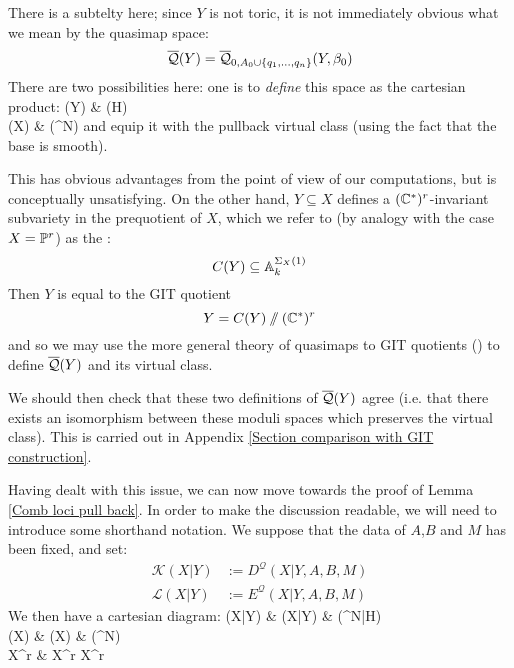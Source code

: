 \begin{remark} \label{GIT comparison remark} There is a subtelty here; since $Y$ is not toric, it is not immediately obvious what we mean by the quasimap space:
\begin{equation*} \overline{\mathcal{Q}}(Y) = \overline{\mathcal Q}_{0,A_0 \cup \{ q_1, \ldots, q_n \}}(Y,\beta_0) \end{equation*}
There are two possibilities here: one is to \emph{define} this space as the cartesian product:
\bcd
{}(Y) \ar[r] \ar[d]  & (H) \ar[d] \\
(X) \ar[r] & (\PP^N)
\ecd
and equip it with the pullback virtual class (using the fact that the base is smooth).

This has obvious advantages from the point of view of our computations, but is conceptually unsatisfying. On the other hand, $Y \subseteq X$ defines a $(\mathbb{C}^*)^r$-invariant subvariety in the prequotient of $X$, which we refer to (by analogy with the case $X=\mathbb P^r$) as the :
\begin{equation*} C(Y) \subseteq \mathbb{A}_k^{\Sigma_X(1)} \end{equation*}
Then $Y$ is equal to the GIT quotient
\begin{equation*} Y = C(Y) \sslash (\mathbb{C}^*)^r \end{equation*}
and so we may use the more general theory of quasimaps to GIT quotients (\cite{CFKM}) to define $\overline{\mathcal{Q}}(Y)$ and its virtual class.

We should then check that these two definitions of $\overline{\mathcal{Q}}(Y)$ agree (i.e. that there exists an isomorphism between these moduli spaces which preserves the virtual class). This is carried out in Appendix \ref{Section comparison with GIT construction}.
\end{remark}

Having dealt with this issue, we can now move towards the proof of Lemma \ref{Comb loci pull back}. In order to make the discussion readable, we will need to introduce some shorthand notation. We suppose that the data of $A$,$B$ and $M$ has been fixed, and set:
\begin{align*}
\mathcal{K}(X|Y) & := D^{\mathcal{Q}}(X|Y,A,B,M) \\
\mathcal{L}(X|Y) & := E^{\mathcal{Q}}(X|Y,A,B,M)
\end{align*}
We then have a cartesian diagram:
\bcd
{}(X|Y) \ar[r] \ar[d]  & (X|Y) \ar[r] \ar[d]  & (\PP^N|H) \ar[d,"\theta"] \\
(X) \ar[r] \ar[d]  & (X) \ar[r] \ar[d] & (\PP^N) \\
X^r \ar[r,"\Delta"] & X^r \times X^r
\ecd

